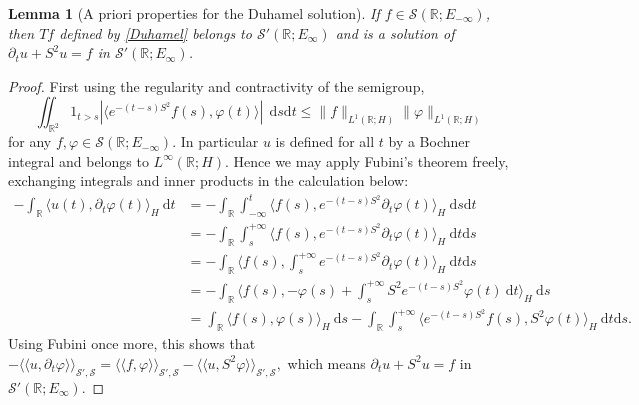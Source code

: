 \documentclass[11pt, letterpaper]{amsart}
\newtheorem{lem}[thm]{Lemma}
\theoremstyle{definition}
\theoremstyle{remark}
\newcommand{\llangle}{\langle\!\langle}
\newcommand{\rrangle}{\rangle\!\rangle}
\numberwithin{equation}{section}
\begin{document}
\begin{lem}[A priori properties for the Duhamel solution] \label{lem:solution} If $f\in \mathcal{S}(\mathbb{R}; E_{-\infty}) $, then  $Tf $ defined by \eqref{Duhamel} belongs to $ \mathcal{S}'(\mathbb{R}; E_{\infty})$ and is a solution of $\partial_t u +S^2 u =f$ in $\mathcal{S}'(\mathbb{R}; E_{\infty})$.
    \end{lem}

    \begin{proof}  
    First using the regularity and contractivity of the semigroup,  
    \begin{equation*}
    \iint_{\mathbb{R}^2} 1_{t>s}|\langle e^{-(t-s)S^2}f(s), \varphi(t)\rangle| \ \ \mathrm{d} s \mathrm d t  \le \|f\|_{L^1(\mathbb{R};H)}  \|\varphi\|_{L^1(\mathbb{R};H)}
        \end{equation*}
        for any $f,\varphi \in \mathcal{S}(\mathbb{R};E_{-\infty})$. In particular $u$ is defined for all $t$ by a Bochner integral and belongs to $ L^\infty(\mathbb{R}; H)$.
        Hence we may apply Fubini's theorem freely, exchanging integrals and inner products in the calculation below:
      \begin{align*}
    -\int_{\mathbb{R}}  \langle u(t) , \partial_t\varphi(t)\rangle_H \ \mathrm{d} t 
    &
    = - \int_{\mathbb{R}} \int_{-\infty}^{t} \langle f(s) , e^{-(t-s)S^2}\partial_t\varphi(t)\rangle_H \ \mathrm{d} s \mathrm d t 
    \\ 
    & = - \int_{\mathbb{R}} \int_{s}^{+\infty} \langle f(s) , e^{-(t-s)S^2}\partial_t\varphi(t)\rangle_H \ \mathrm{d} t \mathrm d s  \\ & =- \int_{\mathbb{R}} \langle f(s) , \int_{s}^{+\infty}  e^{-(t-s)S^2}\partial_t\varphi(t)\rangle_H \ \mathrm{d} t \mathrm d s \\ & = - \int_{\mathbb{R}} \langle f(s) , -\varphi (s)+  \int_{s}^{+\infty} S^2e^{-(t-s)S^2} \varphi(t) \ \mathrm{d} t \rangle_H  \ \mathrm{d} s \\ & = \int_{\mathbb{R}} \langle f(s) , \varphi (s) \rangle_H  \ \mathrm{d} s -  \int_{\mathbb{R}} \int_{s}^{+\infty} \langle  e^{-(t-s)S^2}f(s), S^2 \varphi(t) \rangle_H \ \mathrm{d} t \mathrm d s. 
    \end{align*}
    Using Fubini once more, this shows that 
    $ -\llangle u, \partial_t\varphi \rrangle_{\mathcal{S}',\mathcal{S}}= \llangle f, \varphi \rrangle_{\mathcal{S}',\mathcal{S}} - \llangle u, S^2\varphi \rrangle_{\mathcal{S}',\mathcal{S}},$ 
which means $\partial_t u +S^2 u =f$ in $\mathcal{S}'(\mathbb{R};E_\infty)$. 
    \end{proof}
\end{document}
